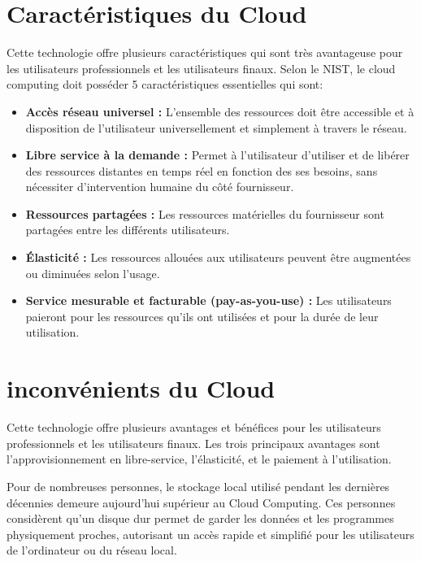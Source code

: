 \section{Caractéristiques du Cloud}
Cette technologie offre plusieurs caractéristiques qui sont très avantageuse pour les utilisateurs professionnels et les utilisateurs finaux. Selon le NIST, le cloud computing doit posséder 5 caractéristiques essentielles qui sont: 

\begin{itemize}[label=\textbullet]
\item \textbf{Accès réseau universel :} L'ensemble des ressources doit être accessible et à disposition de l'utilisateur universellement et simplement à travers le réseau. 

\item \textbf{Libre service à la demande :} Permet à l'utilisateur d'utiliser et de libérer des ressources distantes en temps réel en fonction des ses besoins, sans nécessiter d'intervention humaine du côté fournisseur.

\item \textbf{Ressources partagées :} Les ressources matérielles du fournisseur sont partagées entre les différents utilisateurs.

\item \textbf{Élasticité :} Les ressources allouées aux utilisateurs peuvent être augmentées
ou diminuées selon l'usage.

\item \textbf{Service mesurable et facturable (pay-as-you-use) :} Les utilisateurs
paieront pour les ressources qu'ils ont utilisées et pour la durée de leur utilisation.
\end{itemize}

\section{inconvénients du Cloud}
Cette technologie offre plusieurs avantages et bénéfices pour les utilisateurs professionnels et les utilisateurs finaux. Les trois principaux avantages sont l’approvisionnement en libre-service, l’élasticité, et le paiement à l’utilisation.

Pour de nombreuses personnes, le stockage local utilisé pendant les dernières décennies demeure aujourd’hui supérieur au Cloud Computing. Ces personnes considèrent qu’un disque dur permet de garder les données et les programmes physiquement proches, autorisant un accès rapide et simplifié pour les utilisateurs de l’ordinateur ou du réseau local.

